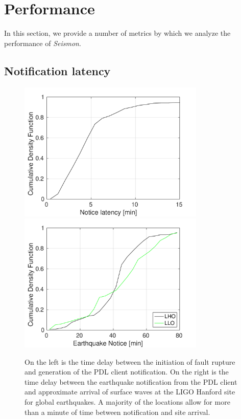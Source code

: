 \documentclass[reprint, prl, aps, showpacs]{revtex4-1}
\begin{document}
\section{Performance}
\label{sec:performance}

In this section, we provide a number of metrics by which we analyze the performance of \emph{Seismon}.

\subsection{Notification latency}

\begin{figure}[t]
\hspace*{-0.5cm}
 \includegraphics[width=3.5in]{earthquake_notice.pdf}
 \includegraphics[width=3.5in]{lockloss_notice.pdf}
 \caption{On the left is the time delay between the initiation of fault rupture and generation of the PDL client notification. On the right is the time delay between the earthquake notification from the PDL client and approximate arrival of surface waves at the LIGO Hanford site for global earthquakes. A majority of the locations allow for more than a minute of time between notification and site arrival.}
 \label{fig:delays}
\end{figure}
\end{document}
